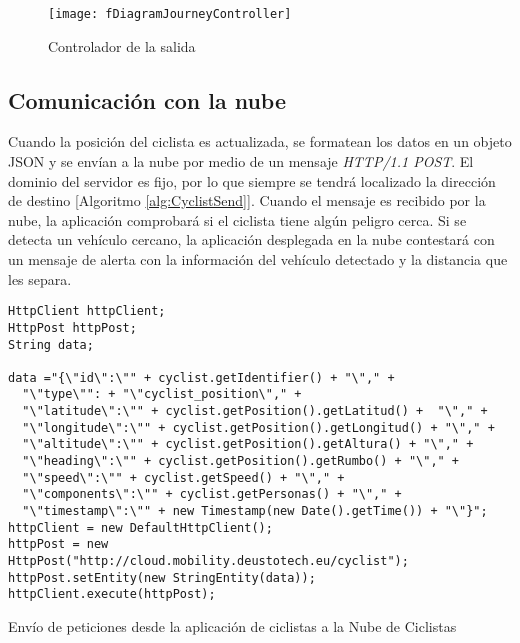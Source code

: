 \begin{figure}[H]
	\begin{center}
	\texttt{[image: fDiagramJourneyController]}
	\caption{Controlador de la salida}
	\label{figure:DiagramController}
	\end{center}
\end{figure}
		
\subsection{Comunicación con la nube}\label{ssection:comunicacion_nube}
Cuando la posición del ciclista es actualizada, se formatean los datos en un objeto JSON y se envían a la nube por medio de un mensaje \emph{HTTP/1.1 POST}. El dominio del servidor es fijo, por lo que siempre se tendrá localizado la dirección de destino [Algoritmo \ref{alg:CyclistSend}]. Cuando el mensaje es recibido por la nube, la aplicación comprobará si el ciclista tiene algún peligro cerca. Si se detecta un vehículo cercano, la aplicación desplegada en la nube contestará con un mensaje de alerta con la información del vehículo detectado y la distancia que les separa.

\begin{listing}
	\begin{minipage}{.4\textwidth}
		\begin{verbatim}
HttpClient httpClient;
HttpPost httpPost;
String data;
							
data ="{\"id\":\"" + cyclist.getIdentifier() + "\"," +
  "\"type\"": + "\"cyclist_position\"," +
  "\"latitude\":\"" + cyclist.getPosition().getLatitud() +  "\"," +
  "\"longitude\":\"" + cyclist.getPosition().getLongitud() + "\"," +
  "\"altitude\":\"" + cyclist.getPosition().getAltura() + "\"," +
  "\"heading\":\"" + cyclist.getPosition().getRumbo() + "\"," +
  "\"speed\":\"" + cyclist.getSpeed() + "\"," +
  "\"components\":\"" + cyclist.getPersonas() + "\"," +
  "\"timestamp\":\"" + new Timestamp(new Date().getTime()) + "\"}";
httpClient = new DefaultHttpClient();
httpPost = new HttpPost("http://cloud.mobility.deustotech.eu/cyclist");
httpPost.setEntity(new StringEntity(data));
httpClient.execute(httpPost);
		\end{verbatim}
	\end{minipage}
	\caption{Envío de peticiones desde la aplicación de ciclistas a la Nube de Ciclistas}\label{alg:CyclistSend}
\end{listing}

